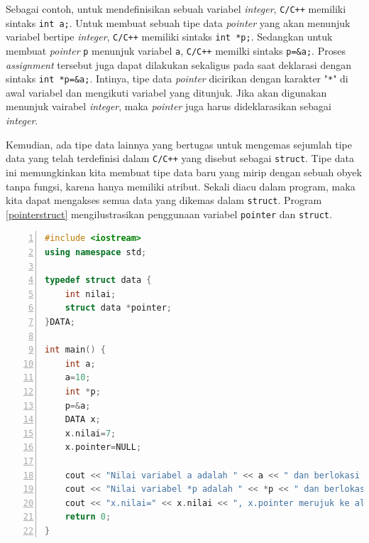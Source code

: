 Sebagai contoh, untuk mendefinisikan sebuah variabel \textit{integer}, \texttt{C/C++} memiliki sintaks \texttt{int a;}. Untuk membuat sebuah tipe data \textit{pointer} yang akan menunjuk variabel bertipe \textit{integer}, \texttt{C/C++} memiliki sintaks \texttt{int *p;}. Sedangkan untuk membuat \textit{pointer} \texttt{p} menunjuk variabel \texttt{a}, \texttt{C/C++} memilki sintaks \texttt{p=\&a;}. Proses \textit{assignment} tersebut juga dapat dilakukan sekaligus pada saat deklarasi dengan sintaks \texttt{int *p=\&a;}. Intinya, tipe data \textit{pointer} dicirikan dengan karakter "\texttt{*}" di awal variabel dan mengikuti variabel yang ditunjuk. Jika akan digunakan menunjuk vairabel \textit{integer}, maka \textit{pointer} juga harus dideklarasikan sebagai \textit{integer}.

Kemudian, ada tipe data lainnya yang bertugas untuk mengemas sejumlah tipe data yang telah terdefinisi dalam \texttt{C/C++} yang disebut sebagai \texttt{struct}. Tipe data ini memungkinkan kita membuat tipe data baru yang mirip dengan sebuah obyek tanpa fungsi, karena hanya memiliki atribut. Sekali diacu dalam program, maka kita dapat mengakses semua data yang dikemas dalam \texttt{struct}. Program \ref{pointerstruct} mengilustrasikan penggunaan variabel \texttt{pointer} dan \texttt{struct}.

\scriptsize
\begin{lstlisting}[language=c++, numbers=left, numberstyle=\tiny, caption=intro.cpp, showstringspaces=false, label=pointerstruct]
#include <iostream>
using namespace std;

typedef struct data {
	int nilai;
	struct data *pointer;
}DATA;

int main() {
	int a;
	a=10;
	int *p;
	p=&a;
	DATA x;
	x.nilai=7;
	x.pointer=NULL;
	
	cout << "Nilai variabel a adalah " << a << " dan berlokasi di alamat " << &a << endl;
	cout << "Nilai variabel *p adalah " << *p << " dan berlokasi di alamat " << p << endl;
	cout << "x.nilai=" << x.nilai << ", x.pointer merujuk ke alamat " << x.pointer << endl;
	return 0;
}
\end{lstlisting}
\normalsize

